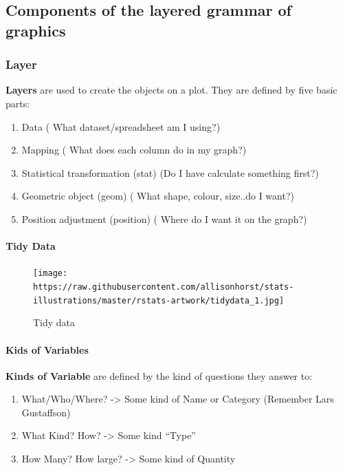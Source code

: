 \documentclass[
]{article}
\providecommand{\tightlist}{%
  \setlength{\itemsep}{0pt}\setlength{\parskip}{0pt}}
\begin{document}
\hypertarget{components-of-the-layered-grammar-of-graphics}{%
\subsection{Components of the layered grammar of
graphics}\label{components-of-the-layered-grammar-of-graphics}}

\hypertarget{layer}{%
\subsubsection{Layer}\label{layer}}

\textbf{Layers} are used to create the objects on a plot. They are
defined by five basic parts:

\begin{enumerate}
\def\labelenumi{\arabic{enumi}.}
\tightlist
\item
  Data ( What dataset/spreadsheet am I using?)
\item
  Mapping ( What does each column do in my graph?)
\item
  Statistical transformation (stat) (Do I have calculate something
  first?)
\item
  Geometric object (geom) ( What shape, colour, size..do I want?)
\item
  Position adjustment (position) ( Where do I want it on the graph?)
\end{enumerate}

\hypertarget{tidy-data}{%
\paragraph{Tidy Data}\label{tidy-data}}

\begin{figure}
\centering
\texttt{[image: https://raw.githubusercontent.com/allisonhorst/stats-illustrations/master/rstats-artwork/tidydata\_1.jpg]}
\caption{Tidy data}
\end{figure}

\hypertarget{kids-of-variables}{%
\paragraph{Kids of Variables}\label{kids-of-variables}}

\textbf{Kinds of Variable} are defined by the kind of questions they
answer to:

\begin{enumerate}
\def\labelenumi{\arabic{enumi}.}
\tightlist
\item
  What/Who/Where? -\textgreater{} Some kind of Name or Category
  (Remember Lars Gustaffson)
\item
  What Kind? How? -\textgreater{} Some kind ``Type''
\item
  How Many? How large? -\textgreater{} Some kind of Quantity
\end{enumerate}
\end{document}
